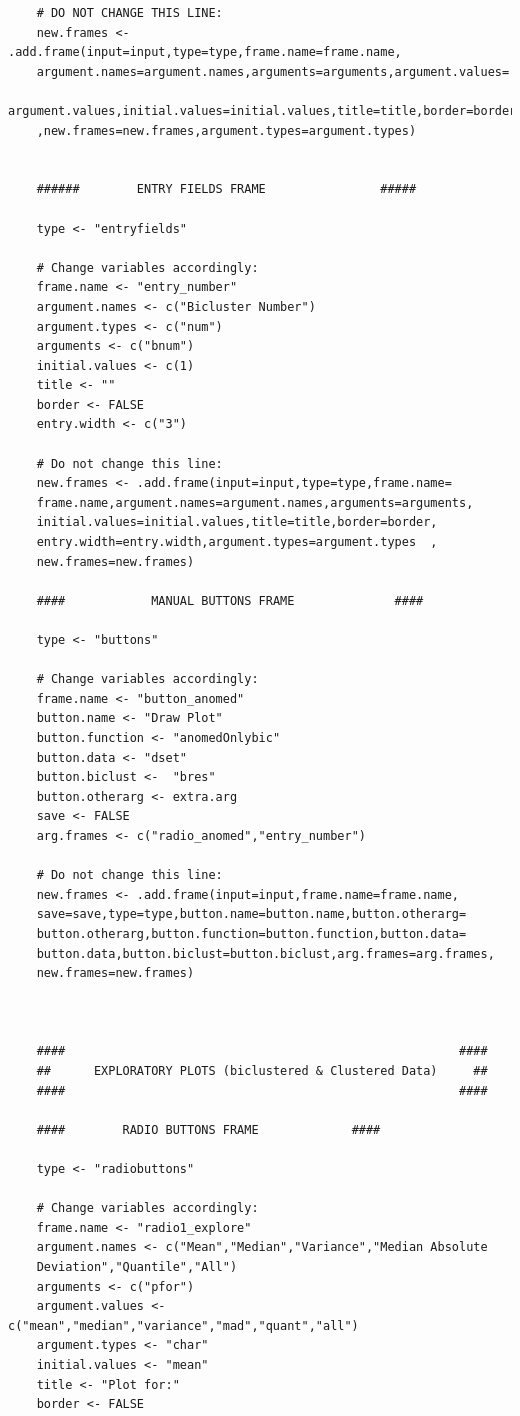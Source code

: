 \documentclass[a4paper]{article}\usepackage[]{graphicx}\usepackage[]{color}
\begin{document}
\begin{verbatim}
	# DO NOT CHANGE THIS LINE:
	new.frames <- .add.frame(input=input,type=type,frame.name=frame.name,
    argument.names=argument.names,arguments=arguments,argument.values=
    argument.values,initial.values=initial.values,title=title,border=border
    ,new.frames=new.frames,argument.types=argument.types)	
	
	
	######		  ENTRY FIELDS FRAME 				#####
	
	type <- "entryfields"
	
	# Change variables accordingly:
	frame.name <- "entry_number"  
	argument.names <- c("Bicluster Number") 
	argument.types <- c("num")
	arguments <- c("bnum")
	initial.values <- c(1)
	title <- ""
	border <- FALSE
	entry.width <- c("3")  
	
	# Do not change this line:
	new.frames <- .add.frame(input=input,type=type,frame.name=
    frame.name,argument.names=argument.names,arguments=arguments,
    initial.values=initial.values,title=title,border=border,
    entry.width=entry.width,argument.types=argument.types  ,
    new.frames=new.frames)
	
	####	    	MANUAL BUTTONS FRAME 			  ####
	
	type <- "buttons"
	
	# Change variables accordingly:
	frame.name <- "button_anomed"  
	button.name <- "Draw Plot"  
	button.function <- "anomedOnlybic" 
	button.data <- "dset" 
	button.biclust <-  "bres" 
	button.otherarg <- extra.arg
	save <- FALSE
	arg.frames <- c("radio_anomed","entry_number") 
	
	# Do not change this line:
	new.frames <- .add.frame(input=input,frame.name=frame.name,
    save=save,type=type,button.name=button.name,button.otherarg=
    button.otherarg,button.function=button.function,button.data=
    button.data,button.biclust=button.biclust,arg.frames=arg.frames,
    new.frames=new.frames)
	
	
	
	####                                                       ####
	##	    EXPLORATORY PLOTS (biclustered & Clustered Data)     ##
	####                                                       ####
	
	####		RADIO BUTTONS FRAME  			####
	
	type <- "radiobuttons"
	
	# Change variables accordingly:
	frame.name <- "radio1_explore"
	argument.names <- c("Mean","Median","Variance","Median Absolute 
    Deviation","Quantile","All")  
	arguments <- c("pfor")		
	argument.values <- c("mean","median","variance","mad","quant","all") 
	argument.types <- "char"
	initial.values <- "mean" 
	title <- "Plot for:"
	border <- FALSE
	

\end{verbatim}
\end{document}
